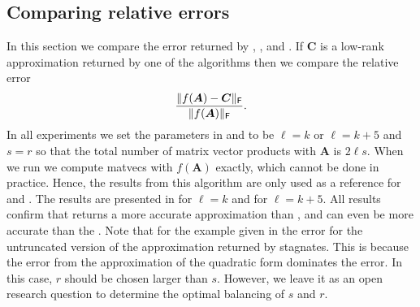 \subsection{Comparing relative errors}
In this section we compare the error returned by ,  , and . If $\bm{C}$ is a low-rank approximation returned by one of the algorithms then we compare the relative error
\begin{equation}\label{eq:relative_error}
    \frac{\|f(\bm{A}) - \bm{C}\|_{\textsf{\textup{F}}}}{\|f(\bm{A})\|_{\textsf{\textup{F}}}}.
\end{equation}
In all experiments we set the parameters in  and  to be $\ell = k$ or $\ell = k + 5$ and $s = r$ so that the total number of matrix vector products with $\bm{A}$ is $2\ell s$. 
When we run  we compute matvecs with $f(\bm{A})$ exactly, which cannot be done in practice. Hence, the results from this algorithm are only used as a reference for  and .
The results are presented in  for $\ell = k$ and  for $\ell = k + 5$. All results confirm that  returns a more accurate approximation than , and can even be more accurate than the . Note that for the example given in  the error for the untruncated version of the approximation returned by  stagnates. This is because the error from the approximation of the quadratic form dominates the error. In this case, $r$ should be chosen larger than $s$. However, we leave it as an open research question to determine the optimal balancing of $s$ and $r$.  


